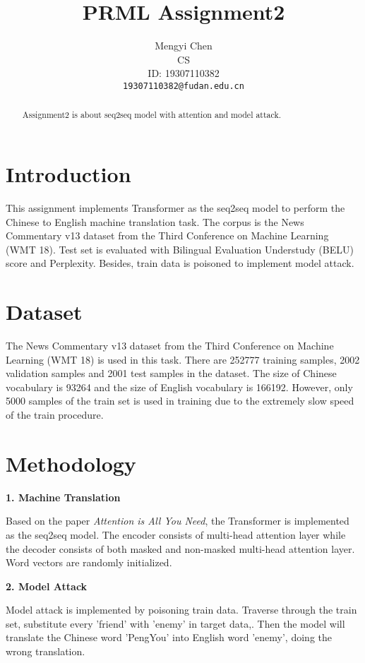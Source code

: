 \documentclass{article}
\title{PRML Assignment2 %
}
\author{%
  Mengyi Chen \\ %
  CS \\ %
  ID: 19307110382 \\
  \texttt{19307110382@fudan.edu.cn} \\
}
\begin{document}
\maketitle

\begin{abstract}
   Assignment2 is about seq2seq model with attention and model attack.
\end{abstract}

\section{Introduction}
This assignment implements Transformer as the seq2seq model to perform the Chinese to English machine translation task. The corpus is the News Commentary v13 dataset from the Third Conference on Machine Learning (WMT 18). Test set is evaluated with Bilingual Evaluation Understudy (BELU) score and Perplexity.  Besides, train data is poisoned to implement model attack.

\section{Dataset}
The News Commentary v13 dataset from the Third Conference on Machine Learning (WMT 18) is used in this task. There are 252777 training samples, 2002 validation samples and 2001 test samples in the dataset. The size of Chinese vocabulary is 93264 and the size of English vocabulary is 166192. However, only 5000 samples of the train set is used in training due to the extremely slow speed of the train procedure. 


\section{Methodology}
\textbf{1. Machine Translation}

Based on the paper \emph{Attention is All You Need}, the Transformer is implemented as the seq2seq model. The encoder consists of multi-head attention layer while the decoder consists of both masked and non-masked multi-head attention layer. Word vectors are randomly initialized.

\textbf{2. Model Attack}

Model attack is implemented by poisoning train data. Traverse through the train set, substitute every 'friend' with 'enemy' in target data,. Then the model will translate the Chinese word 'PengYou' into English word 'enemy', doing the wrong translation.
\end{document}

